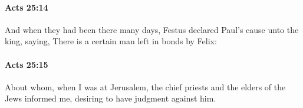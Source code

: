 		\paragraph{Acts 25:14} %
			\label{ACTS-25-14}

			And when they had been there many days, Festus declared Paul's cause unto the king, saying, There is a certain man left in bonds by Felix:

			\begin{framed}
			\scriptsize
				\begin{compactdesc}
					\item[SBLG] 
				\end{compactdesc}
			\end{framed}

		\paragraph{Acts 25:15} %
			\label{ACTS-25-15}

			About whom, when I was at Jerusalem, the chief priests and the elders of the Jews informed me, desiring to have judgment against him.


